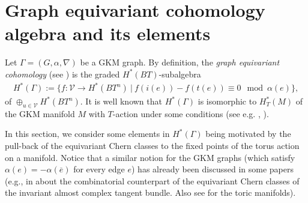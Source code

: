 \documentclass[12pt]{amsart}
\theoremstyle{definition}
\theoremstyle{remark}
\numberwithin{equation}{section}
\begin{document}
\section{Graph equivariant cohomology algebra and its elements}
\label{sect:4}

Let $\Gamma=(G,\alpha,\nabla)$ be a GKM graph.
By definition, the {\it graph equivariant cohomology} (see \cite{GZ}) is the graded $H^{*}(BT)$-subalgebra
\begin{align*}
H^{*}(\Gamma):=\{f:\mathcal{V}\to H^{*}(BT^{n})\ |\ f(i(e))-f(t(e))\equiv 0\mod \alpha(e)\},
\end{align*}
of $\oplus_{u\in \mathcal{V}}H^{*}(BT^{n})$.
It is well known that $H^{*}(\Gamma)$ is isomorphic to $H_{T}^{*}(M)$ of the GKM manifold $M$ with $T$-action under some conditions (see e.g. \cite{GKM,GZ}, \cite[Theorem 2.12]{DKS}).

In this section, we consider some elements in $H^{*}(\Gamma)$ being motivated by the pull-back of the equivariant Chern classes to the fixed points of the torus action on a manifold.
Notice that a similar notion for the GKM graphs (which satisfy $\alpha(e)=-\alpha(\overline{e})$ for every edge $e$) has already been discussed in some papers (e.g., in \cite{GKZ20, Y} about the combinatorial counterpart of the equivariant Chern classes of the invariant almost complex tangent bundle. Also see \cite{P08} for the toric manifolds).

\end{document}
